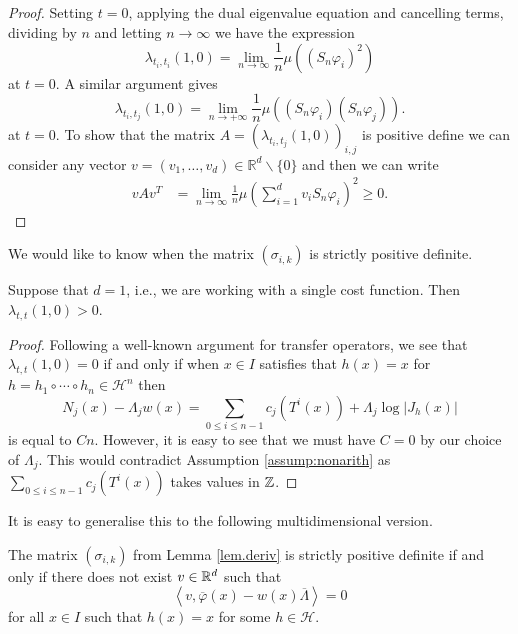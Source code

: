\documentclass[12pt,a4paper,reqno]{amsart}
\begin{document}
\begin{proof}
Setting $t=0$, applying the dual eigenvalue equation  and cancelling terms, dividing by $n$ and letting $n \to \infty$ we have the expression
$$
\lambda_{t_i, t_i}(1,0) = \lim_{n \to \infty} \frac{1}{n}\mu\left( (S_n\varphi_i)^2 \right) 
$$ 
at $t=0$.
A similar argument gives
$$
\lambda_{t_i,t_j}(1,0)  =  \lim_{n \to +\infty} \frac{1}{n}\mu\left((S_n\varphi_i) (S_n\varphi_j) \right).
$$ 
at $t=0$.
To show that the matrix $A = (\lambda_{t_i,t_j}(1,0))_{i,j}$
is positive define we can consider any vector $v =(v_1,\ldots, v_d)  \in \mathbb R^d \backslash \{0\}$ and then we can write 
$$
\begin{aligned}
v A v^T &= %
\lim_{n \to \infty} \frac{1}{n}\mu\left(\sum_{i=1}^d v_i S_n \varphi_i \right)^2 \geq 0.
\end{aligned}
$$
\end{proof}

We would like to know when the matrix $(\sigma_{i,k})$ is strictly positive definite.

\begin{proposition}\label{prop.var}
Suppose that $d=1$, i.e., we are working with a single cost function. Then $\lambda_{t,t}(1,0) > 0$.
\end{proposition}

\begin{proof}
Following a well-known argument for transfer operators, we see that $\lambda_{t,t}(1,0) = 0$ if and only if when $x \in I$ satisfies that $h(x) =x$ for $h = h_1 \circ \cdots \circ h_n \in \mathcal{H}^n$ then
\[
N_j(x) - \Lambda_j w(x) = \sum_{0 \le i \le n-1} c_j(T^i(x)) + \Lambda_j \log|J_h(x)|
\]
is equal to $C n$. However, it is easy to see that we must have $C =0$ by our choice of $\Lambda_j$. This would contradict Assumption \ref{assump:nonarith} as $\sum_{0 \le i \le n-1} c_j(T^i(x)) $ takes values in ${\mathbb Z}$.
\end{proof}

It is easy to generalise this to the following multidimensional version.

\begin{proposition}\label{prop.multivar}
The matrix $(\sigma_{i,k})$ from Lemma \ref{lem.deriv} is strictly positive definite if and only if there does not exist $v \in {\mathbb R}^d$ such that 
\[
 \left\langle v , \overline{\varphi}(x) - w(x) \overline{\Lambda}  \right\rangle = 0
 \]
 for all  $x \in I$ such that $h(x) = x$ for some $h \in\mathcal{H}$.

\end{proposition}
\end{document}
